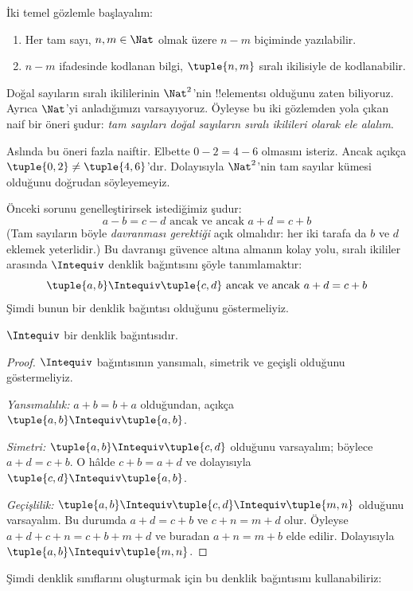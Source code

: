 \documentclass[../../../include/open-logic-section]{subfiles}
\begin{document}

İki temel gözlemle başlayalım:
	\begin{enumerate}
		\item Her tam sayı, $n, m \in\Nat$ olmak üzere $n - m$ biçiminde yazılabilir.
		\item $n - m$ ifadesinde kodlanan bilgi, $\tuple{n, m}$ sıralı ikilisiyle de kodlanabilir.
	\end{enumerate}
Doğal sayıların sıralı ikililerinin $\Nat^2$'nin !!{element}s{}ı olduğunu
zaten biliyoruz. Ayrıca $\Nat$'yi anladığımızı varsayıyoruz. Öyleyse bu iki
gözlemden yola çıkan naif bir öneri şudur: \emph{tam sayıları doğal sayıların
sıralı ikilileri olarak ele alalım}.

Aslında bu öneri fazla naiftir. Elbette $0- 2 = 4 - 6$ olmasını isteriz.
Ancak açıkça $\tuple{0, 2 }\neq \tuple{4, 6}$'dır. Dolayısıyla $\Nat^2$'nin
tam sayılar kümesi olduğunu doğrudan söyleyemeyiz.

Önceki sorunu genelleştirirsek istediğimiz şudur:
	$$a - b = c - d \text{ ancak ve ancak }a + d = c + b$$
(Tam sayıların böyle \emph{davranması gerektiği} açık olmalıdır: her iki
tarafa da $b$ ve $d$ eklemek yeterlidir.) Bu davranışı güvence altına almanın
kolay yolu, sıralı ikililer arasında $\Intequiv$ denklik bağıntısını şöyle
tanımlamaktır:
$$\tuple{ a, b } \Intequiv \tuple{c, d}\text{ ancak ve ancak }a + d = c + b$$
Şimdi bunun bir denklik bağıntısı olduğunu göstermeliyiz.
\begin{prop} $\Intequiv$ bir denklik bağıntısıdır.
\end{prop}
	\begin{proof}
	$\Intequiv$ bağıntısının yansımalı, simetrik ve geçişli olduğunu göstermeliyiz.
	
	\emph{Yansımalılık:} $a + b = b + a$ olduğundan, açıkça
	$\tuple{a, b} \Intequiv \tuple{a, b}$.
	
	\emph{Simetri:} $\tuple{a, b} \Intequiv \tuple{c, d}$ olduğunu varsayalım;
	böylece $a + d = c + b$. O hâlde $c + b = a + d$ ve dolayısıyla
	$\tuple{c, d} \Intequiv \tuple{a, b}$.
	
	\emph{Geçişlilik:} $\tuple{a, b} \Intequiv \tuple{c, d}\Intequiv
	\tuple{m, n}$ olduğunu varsayalım. Bu durumda $a + d = c + b$ ve
	$c + n = m + d$ olur. Öyleyse $a + d + c + n = c + b + m + d$ ve
	buradan $a + n = m + b$ elde edilir. Dolayısıyla
	$\tuple{a, b } \Intequiv \tuple{m, n}$.
\end{proof}

Şimdi denklik sınıflarını oluşturmak için bu denklik bağıntısını kullanabiliriz:
\end{document}
